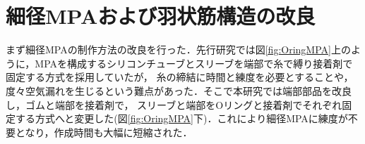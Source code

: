 \documentclass{jarticle}
\begin{document}
\vspace*{-2mm}
\section{細径MPAおよび羽状筋構造の改良}

まず細径MPAの制作方法の改良を行った．先行研究では図\ref{fig:OringMPA}上のように，MPAを構成するシリコンチューブとスリーブを端部で糸で縛り接着剤で固定する方式を採用していたが，
糸の締結に時間と練度を必要とすることや，度々空気漏れを生じるという難点があった．そこで本研究では端部部品を改良し，ゴムと端部を接着剤で，
スリーブと端部をOリングと接着剤でそれぞれ固定する方式へと変更した(図\ref{fig:OringMPA}下)．これにより細径MPAに練度が不要となり，作成時間も大幅に短縮された．
\end{document}

